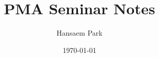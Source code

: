 \usepackage[a4paper, margin=1in]{geometry}

\usepackage{amsmath, amssymb, amsthm}
\usepackage{mathtools}

\usepackage{enumitem}

\usepackage[colorlinks=true, linkcolor=blue, urlcolor=blue, citecolor=blue]{hyperref}

\theoremstyle{definition}
\newtheorem{definition}{Definition}[section]
\newtheorem{example}[definition]{Example}
\newtheorem{exercise}{Exercise}[section]

\let\pmaexercise\exercise
\let\endpmaexercise\endexercise
\renewenvironment{exercise}[1]{%
  \setcounter{exercise}{\numexpr#1-1\relax}%
  \pmaexercise
}{%
  \endpmaexercise
}

\theoremstyle{plain}
\newtheorem{theorem}[definition]{Theorem}
\newtheorem{lemma}[definition]{Lemma}
\newtheorem{proposition}[definition]{Proposition}
\newtheorem*{corollary}{Corollary}

\theoremstyle{remark}
\newtheorem{remark}[definition]{Remark}

\newcommand{\N}{\mathbb{N}}
\newcommand{\Z}{\mathbb{Z}}
\newcommand{\Q}{\mathbb{Q}}
\newcommand{\R}{\mathbb{R}}
\newcommand{\C}{\mathbb{C}}


\DeclareMathOperator{\id}{id}
\DeclareMathOperator{\im}{im}
\DeclareMathOperator{\rank}{rank}
\DeclareMathOperator{\spanv}{span}
\DeclareMathOperator{\diam}{diam}

\title{PMA Seminar Notes}
\author{Hansaem Park}
\date{\today}
